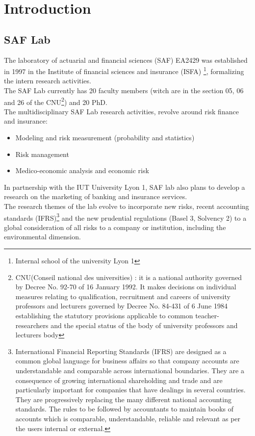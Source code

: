 
\section{Introduction}
\label{sec:introduction}

\subsection{SAF Lab}
\label{sec:ezus-lyon-s.a}

The laboratory of actuarial and  financial sciences (SAF) EA2429 was established
in  1997   in  the  Institute   of  financial  sciences  and   insurance  (ISFA)
\footnote{Internal  school of  the university  Lyon 1},  formalizing the  intern
research activities.\\ 

The  SAF Lab currently has 20 faculty  members (witch are
in  the section  05,  06 and  26 of  the  CNU\footnote{CNU(Conseil national  des
  universities) :  it is a  national authority governed by  Decree No. 92-70  of 16
  January  1992.   It  makes   decisions  on   individual  measures   relating  to
  qualification, recruitment  and careers  of university professors  and lecturers
  governed  by  Decree No.  84-431  of  6  June  1984 establishing  the  statutory
  provisions applicable  to common teacher-researchers  and the special  status of
  the body of university professors and lecturers body}) and 20 PhD.\\ 

The
multidisciplinary SAF Lab  research activities, revolve around  risk finance and
insurance:
\begin{itemize}
\item Modeling and risk measurement (probability and statistics)
\item Risk management
\item Medico-economic analysis and economic risk
\end{itemize}

In partnership with the  IUT University Lyon 1, SAF lab also  plans to develop a
research on the marketing of banking and insurance services. \\


  The research
themes of the  lab evolve to incorporate new risks,  recent accounting standards
(IFRS)\footnote{International Financial Reporting  Standards (IFRS) are designed
  as a  common global language for  business affairs so that  company accounts are
  understandable  and  comparable  across  international boundaries.  They  are  a
  consequence of growing international shareholding and trade and are particularly
  important  for companies  that  have  dealings in  several  countries. They  are
  progressively replacing  the many  different national accounting  standards. The
  rules  to be  followed by  accountants to  maintain books  of accounts  which is
  comparable, understandable, reliable  and relevant as per the  users internal or
  external.}  and the new prudential regulations (Basel 3, Solvency 2) to a global
consideration  of  all  risks  to   a  company  or  institution,  including  the
environmental dimension.\\

